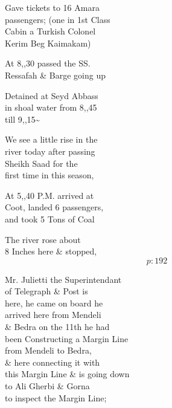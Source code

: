 \documentclass{report}
\begin{document}
	\par{
 	Gave tickets to 16 Amara\ \\passengers; (one in 1st Class\ \\Cabin a Turkish Colonel\ \\Kerim Beg Kaimakam)\ \\
	}

	\par{
 	At 8,,30 passed the SS.\ \\Ressafah \& Barge going up\ \\
	}

	\par{
 	Detained at Seyd Abbass\ \\in shoal water from 8,,45\ \\till 9,,15\~{}\ \\
	}

	\par{
 	We see a little rise in the\ \\river today after passing\ \\Sheikh Saad for the\ \\first time in this season,\ \\
	}

	\par{
 	At 5,,40 P.M. arrived at\ \\Coot, landed 6 passengers,\ \\and took 5 Tons of Coal\ \\
	}

	\par{
 	The river rose about\ \\8 Inches here \& stopped,\ \\
  \[p: 192 \]

	}


	\par{
 	Mr. Julietti the Superintendant\ \\of Telegraph \& Post is\ \\here, he came on board he\ \\arrived here from Mendeli\ \\\& Bedra on the 11th he had\ \\been Constructing a Margin Line\ \\from Mendeli to Bedra,\ \\\& here connecting it with\ \\this Margin Line \& is going down\ \\to Ali Gherbi \& Gorna\ \\to inspect the Margin Line;\ \\
	}
\end{document}
